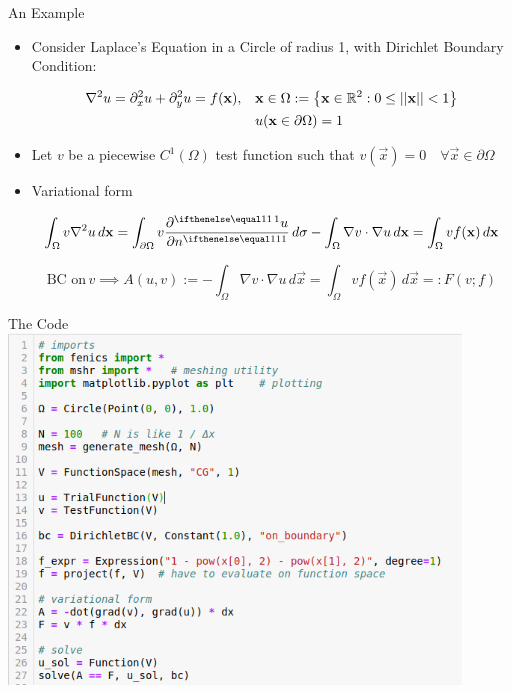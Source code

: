 \documentclass[serif]{beamer}
\begin{document}
\begin{frame}{An Example}
    \begin{itemize}
    \item Consider Laplace's Equation in a Circle of radius 1, with Dirichlet 
    Boundary Condition:
    
    \begin{equation}
        \label{eq:laplace-dirichlet-circle}
        \begin{split}
            \nabla^2 u = \partial_x^2 u + \partial_y^2 u = f(\mathbf{x}), \quad &  
            \mathbf{x} \in \Omega := \left\{\mathbf{x} \in \mathbb{R}^2 : 0 \leq \left|\left| \mathbf{x} \right|\right| 
            < 1\right\} \\
            & u(\mathbf{x} \in \partial \Omega) = 1
        \end{split}
    \end{equation}

    \item Let $v$ be a piecewise $C^1(\Omega)$ test function such that 
    $v(\vec x) = 0 \quad \forall \vec x \in \partial \Omega$
    
    \item Variational form
    
    \[\begin{split}
        \int_\Omega v \nabla^2 u \, d\vec x = 
        \int_{\partial \Omega} v \pder{u}{n} \, d\sigma - 
        \int_\Omega \nabla v \cdot \nabla u \, d\vec x = 
        \int_\Omega v f(\vec x) \, d\vec x
    \end{split}\]
    
    \[
        \text{BC on} \, v \implies A(u, v) := -\int_\Omega \nabla v \cdot \nabla u \, d \vec x = 
        \int_\Omega v f(\vec x) \, d\vec x =: F(v; f)
    \]
    \end{itemize}
\end{frame}

\begin{frame}{The Code}
    \centering
    \includegraphics[width=0.9\textwidth,height=0.9\textheight,keepaspectratio]
    {code-snippets/jupyter-fencis-laplace-circle.png}
\end{frame}
\end{document}
